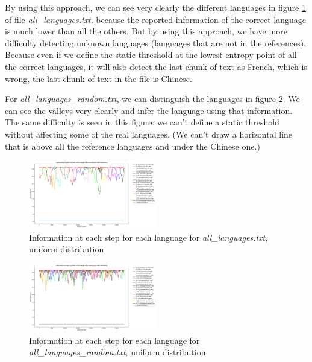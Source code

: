 \documentclass{article}
\begin{document}
By using this approach, we can see very clearly the different languages in figure \ref{fig:all_languages_p_u} of file \textit{all\_languages.txt},
because the reported information of the correct language is much lower than all the others.
But by using this approach, we have more difficulty detecting unknown languages (languages that are not in the references).
Because even if we define the static threshold at the lowest entropy point of all the correct languages,
it will also detect the last chunk of text as French, which is wrong, the last chunk of text in the file is Chinese. %

For \textit{all\_languages\_random.txt}, we can distinguish the languages in figure \ref{fig:all_languages_random_p_u}.
We can see the valleys very clearly and infer the language using that information.
The same difficulty is seen in this figure: we can't define a static threshold without affecting some of the real languages.
(We can't draw a horizontal line that is above all the reference languages and under the Chinese one.)

\begin{figure}
    \centering
    \includegraphics[width=0.5\textwidth]{../results/all_languages/-p_u.png}
    \caption{Information at each step for each language for \textit{all\_languages.txt}, uniform distribution.}
    \label{fig:all_languages_p_u}
\end{figure}

\begin{figure}
    \centering
    \includegraphics[width=0.5\textwidth]{../results/all_languages_random/-p_u.png}
    \caption{Information at each step for each language for \textit{all\_languages\_random.txt}, uniform distribution.}
    \label{fig:all_languages_random_p_u}
\end{figure}
\end{document}
